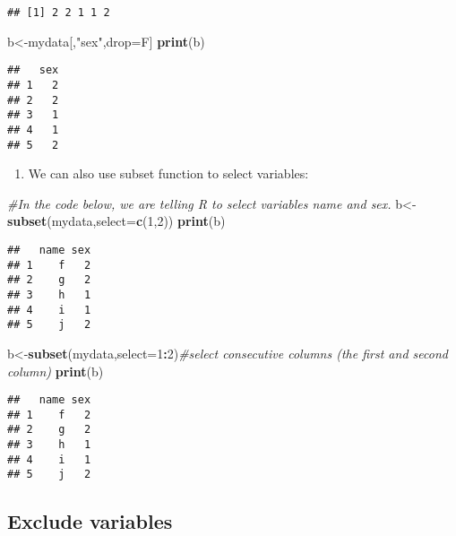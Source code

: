 \documentclass[]{book}
\newenvironment{Shaded}{\begin{snugshade}}{\end{snugshade}}
\newcommand{\KeywordTok}[1]{\textcolor[rgb]{0.13,0.29,0.53}{\textbf{#1}}}
\newcommand{\DataTypeTok}[1]{\textcolor[rgb]{0.13,0.29,0.53}{#1}}
\newcommand{\DecValTok}[1]{\textcolor[rgb]{0.00,0.00,0.81}{#1}}
\newcommand{\StringTok}[1]{\textcolor[rgb]{0.31,0.60,0.02}{#1}}
\newcommand{\CommentTok}[1]{\textcolor[rgb]{0.56,0.35,0.01}{\textit{#1}}}
\newcommand{\OperatorTok}[1]{\textcolor[rgb]{0.81,0.36,0.00}{\textbf{#1}}}
\newcommand{\NormalTok}[1]{#1}
\providecommand{\tightlist}{%
  \setlength{\itemsep}{0pt}\setlength{\parskip}{0pt}}
\theoremstyle{definition}
\theoremstyle{definition}
\theoremstyle{definition}
\theoremstyle{remark}
\begin{document}
\begin{verbatim}
## [1] 2 2 1 1 2
\end{verbatim}

\begin{Shaded}
\begin{Highlighting}[]
\NormalTok{b<-mydata[,}\StringTok{"sex"}\NormalTok{,drop=F]}
\KeywordTok{print}\NormalTok{(b)}
\end{Highlighting}
\end{Shaded}

\begin{verbatim}
##   sex
## 1   2
## 2   2
## 3   1
## 4   1
## 5   2
\end{verbatim}

\begin{enumerate}
\def\labelenumi{(\arabic{enumi})}
\setcounter{enumi}{2}
\tightlist
\item
  We can also use subset function to select variables:
\end{enumerate}

\begin{Shaded}
\begin{Highlighting}[]
\CommentTok{#In the code below, we are telling R to select variables name and sex. }
\NormalTok{b<-}\KeywordTok{subset}\NormalTok{(mydata,}\DataTypeTok{select=}\KeywordTok{c}\NormalTok{(}\DecValTok{1}\NormalTok{,}\DecValTok{2}\NormalTok{))}
\KeywordTok{print}\NormalTok{(b)}
\end{Highlighting}
\end{Shaded}

\begin{verbatim}
##   name sex
## 1    f   2
## 2    g   2
## 3    h   1
## 4    i   1
## 5    j   2
\end{verbatim}

\begin{Shaded}
\begin{Highlighting}[]
\NormalTok{b<-}\KeywordTok{subset}\NormalTok{(mydata,}\DataTypeTok{select=}\DecValTok{1}\OperatorTok{:}\DecValTok{2}\NormalTok{)}\CommentTok{#select consecutive columns (the first and second column)}
\KeywordTok{print}\NormalTok{(b)}
\end{Highlighting}
\end{Shaded}

\begin{verbatim}
##   name sex
## 1    f   2
## 2    g   2
## 3    h   1
## 4    i   1
## 5    j   2
\end{verbatim}

\subsection{Exclude variables}\label{exclude-variables}
\end{document}

